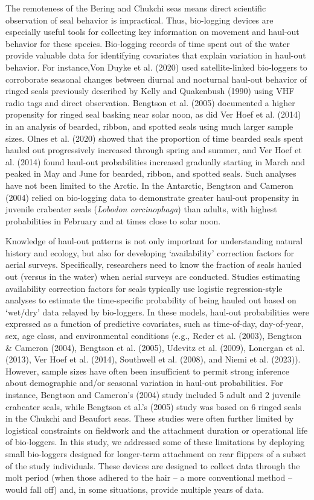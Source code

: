 \documentclass[fleqn,10pt,lineno]{wlpeerj} %
\begin{document}
The remoteness of the Bering and Chukchi seas means direct scientific
observation of seal behavior is impractical. Thus, bio-logging devices are
especially useful tools for collecting key information on movement and haul-out
behavior for these species. Bio-logging records of time spent out of the water
provide valuable data for identifying covariates that explain variation in
haul-out behavior. For instance,Von Duyke et al. (2020) used
satellite-linked bio-loggers to corroborate seasonal changes between diurnal and
nocturnal haul-out behavior of ringed seals previously described by Kelly and
Quakenbush (1990) using VHF radio tags and direct observation. Bengtson
et al. (2005) documented a higher propensity for ringed seal basking
near solar noon, as did Ver Hoef et al. (2014) in an analysis of
bearded, ribbon, and spotted seals using much larger sample sizes. Olnes et al.
(2020) showed that the proportion of time bearded seals spent hauled out
progressively increased through spring and summer, and Ver Hoef et al.
(2014) found haul-out probabilities increased gradually starting in
March and peaked in May and June for bearded, ribbon, and spotted seals. Such
analyses have not been limited to the Arctic. In the Antarctic, Bengtson and
Cameron (2004) relied on bio-logging data to demonstrate greater
haul-out propensity in juvenile crabeater seals (\emph{Lobodon carcinophaga}) than
adults, with highest probabilities in February and at times close to solar noon.

Knowledge of haul-out patterns is not only important for understanding natural
history and ecology, but also for developing `availability' correction factors
for aerial surveys. Specifically, researchers need to know the fraction of seals
hauled out (versus in the water) when aerial surveys are conducted. Studies
estimating availability correction factors for seals typically use logistic
regression-style analyses to estimate the time-specific probability of being
hauled out based on `wet/dry' data relayed by bio-loggers. In these models,
haul-out probabilities were expressed as a function of predictive covariates,
such as time-of-day, day-of-year, sex, age class, and environmental conditions
(e.g., Reder et al. (2003), Bengtson \& Cameron (2004), Bengtson et al. (2005), Udevitz et al. (2009), Lonergan et al. (2013),
Ver Hoef et al. (2014), Southwell et al. (2008), and Niemi et al. (2023)). However, sample sizes have often been
insufficient to permit strong inference about demographic and/or seasonal
variation in haul-out probabilities. For instance, Bengtson and Cameron's
(2004) study included 5 adult and 2 juvenile crabeater seals, while
Bengtson et al.'s (2005) study was based on 6 ringed seals in the
Chukchi and Beaufort seas. These studies were often further limited by
logistical constraints on fieldwork and the attachment duration or operational
life of bio-loggers. In this study, we addressed some of these limitations by
deploying small bio-loggers designed for longer-term attachment on rear flippers
of a subset of the study individuals. These devices are designed to collect data
through the molt period (when those adhered to the hair -- a more conventional
method -- would fall off) and, in some situations, provide multiple years of
data.
\end{document}
